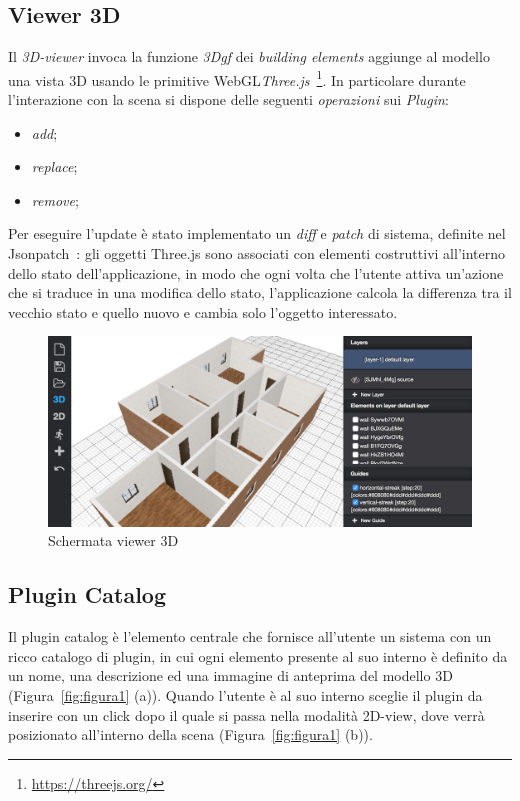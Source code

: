 \subsection{Viewer 3D}
Il \emph{3D-viewer} invoca la funzione \emph{3Dgf} dei \emph{building elements} aggiunge al modello una vista 3D usando
le primitive WebGL\emph{Three.js}~\footnote{\url{https://threejs.org/}}.
In particolare durante l'interazione con la scena si dispone delle seguenti \textit{operazioni} sui \emph{Plugin}:
\begin{itemize}
  \item \emph{add};
  \item \emph{replace};
  \item \emph{remove};
\end{itemize}
Per eseguire l'update è stato implementato un \emph{diff} e \emph{patch} di
sistema, definite nel Jsonpatch~\cite{rfc6902}: gli oggetti Three.js sono associati con elementi costruttivi all'interno
dello stato dell'applicazione, in modo che ogni volta che l'utente attiva un'azione che si traduce in una modifica dello stato,
l'applicazione calcola la differenza tra il vecchio stato e quello nuovo e cambia solo l'oggetto interessato.\\


\begin{figure}[htbp] %
   \centering
   \includegraphics[width=1\linewidth]{images/3d}
   \caption{Schermata viewer 3D }
   \label{fig:viewer3D}
\end{figure}
\newpage

\subsection{Plugin Catalog}
\label{sec:chapter_2_section_2_sub_3}

\noindent
 Il plugin catalog \`e l'elemento centrale che fornisce all'utente un sistema con un ricco catalogo di plugin,
 in cui ogni elemento presente al suo interno \`e definito da un nome, una descrizione ed una
 immagine di anteprima del modello 3D (Figura~\ref{fig:figura1} (a)). Quando l'utente \`e al suo interno
 sceglie il plugin da inserire con un click dopo il quale si passa nella modalit\`a 2D-view, dove verrà posizionato
 all'interno della scena (Figura~\ref{fig:figura1} (b)).\\


